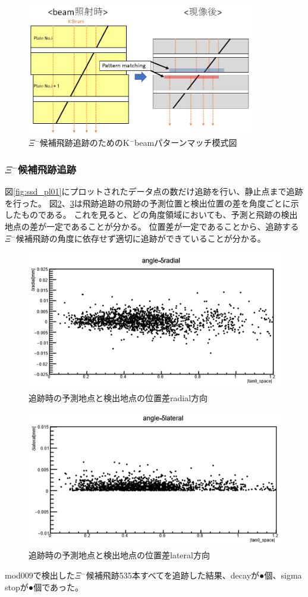 \documentclass[12pt,a4paper]{jarticle}
\begin{document}
\begin{figure}[htbp]
  \centering
     \includegraphics[width=100mm]{beam_mosikizu.png}
  \caption{$\Xi$$^-$候補飛跡追跡のためのK$^-$beamパターンマッチ模式図\label{fig:beam_mosikizu2}}
\end{figure}
\newpage
\subsubsection{$\Xi$$^-$候補飛跡追跡}
図\ref{fig:ssd_pl01}にプロットされたデータ点の数だけ追跡を行い、静止点まで追跡を行った。
図\ref{fig:tan_razial}、\ref{fig:tan_latelal}は飛跡追跡の飛跡の予測位置と検出位置の差を角度ごとに示したものである。
これを見ると、どの角度領域においても、予測と飛跡の検出地点の差が一定であることが分かる。
位置差が一定であることから、追跡する$\Xi$$^-$候補飛跡の角度に依存せず適切に追跡ができていることが分かる。
\begin{figure}[htbp]
  \centering
     \includegraphics[width=120mm]{radial.png}
  \caption{追跡時の予測地点と検出地点の位置差radial方向\label{fig:tan_razial}}
\end{figure}
\begin{figure}[htbp]
  \centering
     \includegraphics[width=120mm]{lateral.png}
  \caption{追跡時の予測地点と検出地点の位置差lateral方向\label{fig:tan_latelal}}
\end{figure}
\par
mod009で検出した$\Xi$$^-$候補飛跡535本すべてを追跡した結果、decayが●個、sigma stopが●個であった。
\end{document}
